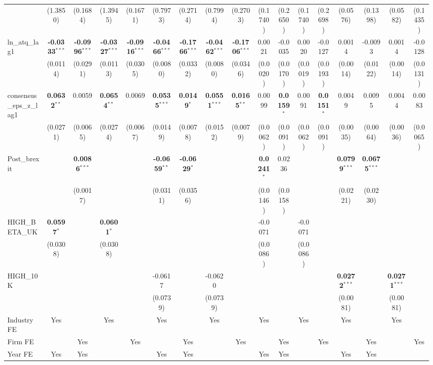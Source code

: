 \begin{landscape}
\begin{table}[H]
\begin{tabular}{lcccccccccccccccc}
 & (1.3850) & (0.1684) & (1.3945) & (0.1671) & (0.7973) & (0.2714) & (0.7994) & (0.2703) & (0.1740) & (0.2650) & (0.1740) & (0.2698) & (0.0576) & (0.1398) & (0.0582) & (0.1435) \\
ln\_atq\_lag1 & \textbf{-0.0333}$^{***}$ & \textbf{-0.0996}$^{***}$ & \textbf{-0.0327}$^{***}$ & \textbf{-0.0916}$^{***}$ & \textbf{-0.0466}$^{***}$ & \textbf{-0.1766}$^{***}$ & \textbf{-0.0462}$^{***}$ & \textbf{-0.1706}$^{***}$ & 0.0021 & -0.0035 & 0.0020 & -0.0127 & 0.0014 & -0.0093 & 0.0014 & -0.0128 \\
 & (0.0114) & (0.0291) & (0.0113) & (0.0305) & (0.0080) & (0.0332) & (0.0080) & (0.0346) & (0.0020) & (0.0170) & (0.0019) & (0.0193) & (0.0014) & (0.0122) & (0.0014) & (0.0131) \\
consensus\_eps\_z\_lag1 & \textbf{0.0632}$^{**}$ & 0.0059 & \textbf{0.0654}$^{**}$ & 0.0069 & \textbf{0.0535}$^{***}$ & \textbf{0.0149}$^{*}$ & \textbf{0.0551}$^{***}$ & \textbf{0.0165}$^{**}$ & 0.0099 & \textbf{0.0159}$^{*}$ & 0.0091 & \textbf{0.0151}$^{*}$ & 0.0049 & 0.0095 & 0.0044 & 0.0083 \\
 & (0.0271) & (0.0065) & (0.0274) & (0.0067) & (0.0149) & (0.0078) & (0.0152) & (0.0079) & (0.0062) & (0.0091) & (0.0062) & (0.0091) & (0.0035) & (0.0064) & (0.0036) & (0.0065) \\
Post\_brexit &  & \textbf{0.0086}$^{***}$ &  &  & \textbf{-0.0659}$^{**}$ & \textbf{-0.0629}$^{*}$ &  &  & \textbf{0.0241}$^{*}$ & 0.0236 &  &  & \textbf{0.0799}$^{***}$ & \textbf{0.0675}$^{***}$ &  &  \\
 &  & (0.0017) &  &  & (0.0311) & (0.0356) &  &  & (0.0146) & (0.0158) &  &  & (0.0221) & (0.0230) &  &  \\
HIGH\_BETA\_UK & \textbf{0.0597}$^{*}$ &  & \textbf{0.0601}$^{*}$ &  &  &  &  &  & -0.0071 &  & -0.0071 &  &  &  &  &  \\
 & (0.0308) &  & (0.0308) &  &  &  &  &  & (0.0086) &  & (0.0086) &  &  &  &  &  \\
HIGH\_10K &  &  &  &  & -0.0617 &  & -0.0620 &  &  &  &  &  & \textbf{0.0272}$^{***}$ &  & \textbf{0.0271}$^{***}$ &  \\
 &  &  &  &  & (0.0739) &  & (0.0739) &  &  &  &  &  & (0.0081) &  & (0.0081) &  \\
\midrule
Industry FE & Yes &  & Yes &  & Yes &  & Yes &  & Yes &  & Yes &  & Yes &  & Yes &  \\
Firm FE &  & Yes &  & Yes &  & Yes &  & Yes &  & Yes &  & Yes &  & Yes &  & Yes \\
Year FE & Yes & Yes &  &  & Yes & Yes &  &  & Yes & Yes &  &  & Yes & Yes &  &  \\

\end{tabular}
\end{table}
\end{landscape}
